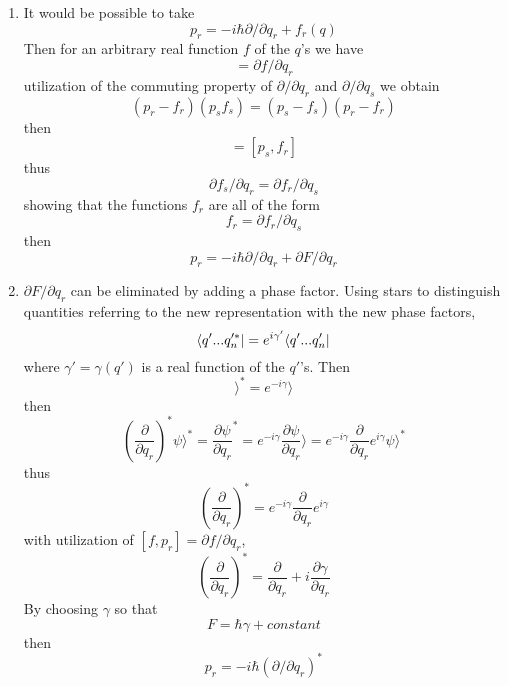 \begin{enumerate}
	\item It would be possible to take
	\begin{equation}
	p_r = -i\hbar \partial/\partial q_r + f_r(q)
	\end{equation}
	Then for an arbitrary real function $f$ of the $q$'s we have
	\begin{equation}
	[f,p_r]=\partial f/\partial q_r
	\end{equation}
	utilization of the commuting property of $\partial/\partial q_r$ and $\partial/\partial q_s$ we obtain
	\begin{equation}
	(p_r - f_r)(p_s f_s) = (p_s - f_s)(p_r - f_r)
	\end{equation}
	then
	\begin{equation}
	[p_r,f_s]=[p_s,f_r]
	\end{equation}
	thus
	\begin{equation}
	\partial f_s /\partial q_r = \partial f_r /\partial q_s
	\end{equation}
	showing that the functions $f_r$ are all of the form
	\begin{equation}
	f_r = \partial f_r/\partial q_s
	\end{equation}
	then
	\begin{equation}
	p_r= -i\hbar \partial / \partial q_r + \partial F/\partial q_r
	\end{equation}

	\item $\partial F/\partial q_r$ can be eliminated by adding a phase factor. Using stars to distinguish quantities referring to the new representation with the new phase factors,
	\begin{equation}
	\langle q'...q_n'^* |=e^{i\gamma'}\langle q'...q'_n |
	\end{equation}
	where $\gamma'= \gamma(q')$ is a real function of the $q'$'s. Then
	\begin{equation}
	\rangle^*=e^{-i\gamma} \rangle
	\end{equation}
	then
	\begin{equation}
	\left(\frac{\partial}{\partial q_r}\right)^* \psi \rangle ^* = \frac{\partial \psi}{\partial q_r}^* = e^{-i\gamma} \frac{\partial \psi}{\partial q_r} \rangle = e^{-i\gamma} \frac{\partial}{\partial q_r} e^{i\gamma} \psi \rangle^*
	\end{equation}
	thus
	\begin{equation}
	\left(\frac{\partial}{\partial q_r}\right)^* =  e^{-i\gamma} \frac{\partial}{\partial q_r} e^{i\gamma}
	\end{equation}
	with utilization of $[f,p_r]=\partial f/\partial q_r$,
	\begin{equation}
	\left(\frac{\partial}{\partial q_r}\right)^* =\frac{\partial}{\partial q_r} + i\frac{\partial \gamma}{\partial q_r}
	\end{equation}
	By choosing $\gamma$ so that
	\begin{equation}
	F= \hbar \gamma + constant
	\end{equation}
	then
	\begin{equation}
	p_r = -i\hbar (\partial/\partial q_r)^*
	\end{equation}


\end{enumerate}
